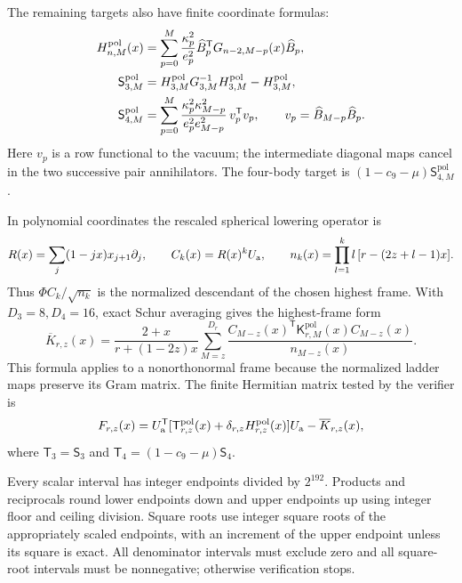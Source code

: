\documentclass[11pt]{article}
\begin{document}
The remaining targets also have finite coordinate formulas:
\begin{align}\label{eq:interval-target-forms}
 H^{\mathrm{pol}}_{n,M}(x)
 &=\sum_{p=0}^M\frac{\kappa_p^2}{e_p^2}
    \widehat B_p^{\mathsf T}G_{n-2,M-p}(x)\widehat B_p,\notag\\
 \mathsf S^{\mathrm{pol}}_{3,M}
 &=H^{\mathrm{pol}}_{3,M}G_{3,M}^{-1}H^{\mathrm{pol}}_{3,M}
       -H^{\mathrm{pol}}_{3,M},\notag\\
 \mathsf S^{\mathrm{pol}}_{4,M}
 &=\sum_{p=0}^M\frac{\kappa_p^2\kappa_{M-p}^2}
                    {e_p^2 e_{M-p}^2}\,v_p^{\mathsf T}v_p,
 \qquad v_p=\widehat B_{M-p}\widehat B_p.
\end{align}
Here $v_p$ is a row functional to the vacuum; the intermediate diagonal
maps cancel in the two successive pair annihilators. The four-body target
is $(1-c_9-\mu)\mathsf S^{\mathrm{pol}}_{4,M}$.

In polynomial coordinates the rescaled spherical lowering operator is
\begin{equation}\label{eq:interval-descendant-polynomial}
 R(x)=\sum_j(1-jx)x_{j+1}\partial_j,
 \qquad C_k(x)=R(x)^kU_{\rm a},\qquad
 n_k(x)=\prod_{l=1}^k l\,[r-(2z+l-1)x].
\end{equation}
Thus $\Phi C_k/\sqrt{n_k}$ is the normalized descendant of the chosen
highest frame. With $D_3=8,D_4=16$, exact Schur averaging gives the
highest-frame form
\begin{equation}\label{eq:interval-Schur}
 \overline K_{r,z}(x)=\frac{2+x}{r+(1-2z)x}
 \sum_{M=z}^{D_r}
 \frac{C_{M-z}(x)^{\mathsf T}\mathsf K^{\mathrm{pol}}_{r,M}(x)
 C_{M-z}(x)}{n_{M-z}(x)}.
\end{equation}
This formula applies to a nonorthonormal frame because the normalized
ladder maps preserve its Gram matrix. The finite Hermitian matrix tested
by the verifier is
\begin{equation}\label{eq:interval-final-matrix}
 F_{r,z}(x)=U_{\rm a}^{\mathsf T}
  [\mathsf T^{\mathrm{pol}}_{r,z}(x)
     +\delta_{r,z}H^{\mathrm{pol}}_{r,z}(x)]U_{\rm a}
       -\overline K_{r,z}(x),
\end{equation}
where $\mathsf T_3=\mathsf S_3$ and
$\mathsf T_4=(1-c_9-\mu)\mathsf S_4$.

Every scalar interval has integer endpoints divided by
$2^{192}$. Products and reciprocals round lower endpoints down and upper
endpoints up using integer floor and ceiling division. Square roots use
integer square roots of the appropriately scaled endpoints, with an
increment of the upper endpoint unless its square is exact. All
denominator intervals must exclude zero and all square-root intervals
must be nonnegative; otherwise verification stops.
\end{document}
